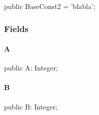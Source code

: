 \documentclass{report}
\begin{document}
\begin{list}{}{
\setlength{\itemindent}{0cm}
\setlength{\listparindent}{0cm}
\setlength{\leftmargin}{\evensidemargin}
\addtolength{\leftmargin}{\tmplength}
\settowidth{\labelsep}{X}
\addtolength{\leftmargin}{\labelsep}
\setlength{\labelwidth}{\tmplength}
}
\begin{flushleft}
\item[\textbf{Declaration}\hfill]
\begin{ttfamily}
public BaseConst2 = 'blabla';\end{ttfamily}


\end{flushleft}
\end{list}
\subsubsection*{\large{\textbf{Fields}}\normalsize\hspace{1ex}\hfill}
\paragraph*{A}\hspace*{\fill}

\begin{list}{}{
\setlength{\itemindent}{0cm}
\setlength{\listparindent}{0cm}
\setlength{\leftmargin}{\evensidemargin}
\addtolength{\leftmargin}{\tmplength}
\settowidth{\labelsep}{X}
\addtolength{\leftmargin}{\labelsep}
\setlength{\labelwidth}{\tmplength}
}
\begin{flushleft}
\item[\textbf{Declaration}\hfill]
\begin{ttfamily}
public A: Integer;\end{ttfamily}


\end{flushleft}
\end{list}
\paragraph*{B}\hspace*{\fill}

\begin{list}{}{
\setlength{\itemindent}{0cm}
\setlength{\listparindent}{0cm}
\setlength{\leftmargin}{\evensidemargin}
\addtolength{\leftmargin}{\tmplength}
\settowidth{\labelsep}{X}
\addtolength{\leftmargin}{\labelsep}
\setlength{\labelwidth}{\tmplength}
}
\begin{flushleft}
\item[\textbf{Declaration}\hfill]
\begin{ttfamily}
public B: Integer;\end{ttfamily}


\end{flushleft}
\end{list}
\end{document}

